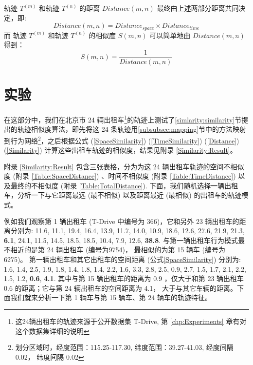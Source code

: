 \vspace{2mm}
轨迹 $T^{(m)}$ 和轨迹 $T^{(n)}$ 的距离 $Distance(m,n)$ 最终由上述两部分距离共同决定，即:
\vspace{2mm}
\begin{equation}
\label{Distance}
Distance(m,n) = Distance_{space} \times Distance_{time}
\end{equation}
\vspace{2mm}
而 轨迹 $T^{(m)}$ 和轨迹 $T^{(n)}$ 的相似度 $S(m,n)$ 可以简单地由 $Distance(m,n)$ 得到：
\vspace{2mm}
\begin{equation}
\label{Similarity}
S(m,n) = \frac{1}{Distance(m,n)}
\end{equation}
\vspace{2mm}
\section{实验}
\label{simlarity:experiment}
在这部分中，我们在北京市 24 辆出租车\footnote{这24辆出租车的轨迹来源于公开数据集 T-Drive, 第 \ref{chp:Experiments} 章有对这个数据集详细的说明}的轨迹上测试了\ref{simlarity:similarity}节提出的轨迹相似度算法，即先将这 24 条轨迹用\ref{subsubsec:mapping}节中的方法映射到行为网络\footnote{划分区域时，经度范围：115.25-117.30, 纬度范围：39.27-41.03, 经度间隔 0.02， 纬度间隔 0.02}，之后根据公式 (\ref{SpaceSimilarity}) (\ref{TimeSimilarity}) (\ref{Distance}) (\ref{Similarity}) 计算这些出租车轨迹的相似度，结果见附录 \ref{Similarity:Result}。\par
附录 \ref{Similarity:Result} 包含三张表格，分为为这 24 辆出租车轨迹的空间不相似度 (附录 \ref{Table:SpaceDistance}) 、时间不相似度 (附录 \ref{Table:TimeDistance}) 以及最终的不相似度 (附录 \ref{Table:TotalDistance}). 下面，我们随机选择一辆出租车，分析一下与它距离最远 (最不相似) 以及距离最近 (最相似) 的出租车的轨迹模式。\par
例如我们观察第 1 辆出租车 (T-Drive 中编号为 366)，它和另外 23 辆出租车的距离分别为: 11.6, 11.1, 19.4, 16.4, 13.9, 11.7, 14.0, 10.9, 18.6, 12.6, 27.6, 21.9, 21.3, \textbf{6.1}, 24.1, 11.5, 14.5, 18.5, 18.5, 10.4, 7.9, 12.6, \textbf{38.8}. 与第一辆出租车行为模式最不相近的是第 24 辆出租车 (编号为9754)， 最相似的为第 15 辆车 (编号为 6275)。 第一辆出租车和其它出租车的空间距离 (公式\ref{SpaceSimilarity}) 分别为: 1.6, 1.4, 2.5, 1.9, 1.8, 1.4, 1.8, 1.4, 2.2, 1.6, 3.3, 2.8, 2.5, 0.9, 2.7, 1.5, 1.7, 2.1, 2.2, 1.5, 1.2, \textbf{0.6}, \textbf{4.1}. 其中与第 15 辆出租车的距离为 0.9 ，仅大于和第 23 辆出租车 0.6 的距离；它与第 24 辆出租车的空间距离为 4.1， 大于与其它车辆的距离。下面我们就来分析一下第 1 辆车与第 15 辆车、第 24 辆车的轨迹特征。\par

